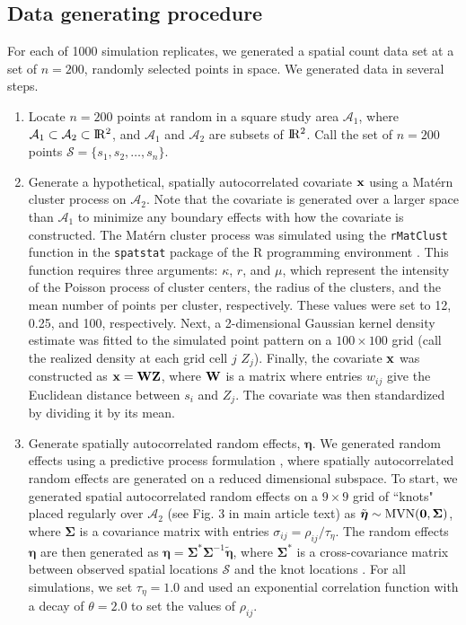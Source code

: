\documentclass[12pt,fleqn]{article}
\def\bfx{{\bf x}}
\def\bfeta{\boldsymbol{\eta}}
\def\bfSigma{\boldsymbol{\Sigma}}
\def\R2{\rm I\!R^2}
\begin{document}
\rm \begin{flushleft}

\section{Data generating procedure}

For each of 1000 simulation replicates, we generated a spatial count data set at a set of $n=200$, randomly selected points in space.  We generated data in several steps.

\begin{enumerate}
  \item Locate $n=200$ points at random in a square study area $\mathcal{A}_1$, where $\mathcal{A}_1 \subset \mathcal{A}_2 \subset \R2$, and $\mathcal{A}_1$ and $\mathcal{A}_2$ are subsets of $\R2$.  Call the set of $n=200$ points $\mathcal{S} = \{ s_1, s_2, \hdots, s_n \}$.
  \item Generate a hypothetical, spatially autocorrelated covariate $\bfx$ using a Mat\'{e}rn cluster process on $\mathcal{A}_2$.  Note that the covariate is generated over a larger space than $\mathcal{A}_1$ to minimize any boundary effects with how the covariate is constructed.  The Mat\'{e}rn cluster process was simulated using the \texttt{rMatClust} function in the \texttt{spatstat} package \citep{BaddeleyEtAl2015} of the R programming environment \citep{RTeam2015}.  This function requires three arguments: $\kappa$, $r$, and $\mu$, which represent the intensity of the Poisson process of cluster centers, the radius of the clusters, and the mean number of points per cluster, respectively.  These values were set to 12, 0.25, and 100, respectively.  Next, a 2-dimensional Gaussian kernel density estimate was fitted to the simulated point pattern on a $100 \times 100$ grid (call the realized density at each grid cell $j$ $Z_j$).  Finally, the covariate $\bfx$ was constructed as $\bfx = {\bf W} {\bf Z}$, where ${\bf W}$ is a matrix where entries $w_{ij}$ give the Euclidean distance between $s_i$ and $Z_j$.  The covariate was then standardized by dividing it by its mean.
  \item Generate spatially autocorrelated random effects, $\bfeta$.  We generated random effects using a predictive process formulation \citep{BanerjeeEtAl2008}, where spatially autocorrelated random effects are generated on a reduced dimensional subspace.  To start, we generated spatial autocorrelated random effects on a $9 \times 9$ grid of ``knots" placed regularly over $\mathcal{A}_2$ (see Fig. 3 in main article text) as $\tilde{\bfeta} \sim \textrm{MVN}({\bf 0},\bfSigma)$, where $\bfSigma$ is a covariance matrix with entries $\sigma_{ij} = \rho_{ij}/\tau_\eta$.  The random effects $\bfeta$ are then generated as $\bfeta = \bfSigma^* \bfSigma^{-1} \tilde{\bfeta}$, where $\bfSigma^*$ is a cross-covariance matrix between observed spatial locations $\mathcal{S}$ and the knot locations \citep{BanerjeeEtAl2008}.  For all simulations, we set $\tau_\eta = 1.0$ and used an exponential correlation function with a decay of $\theta=2.0$ to set the values of $\rho_{ij}$.

\end{enumerate}
\end{flushleft}
\end{document}
